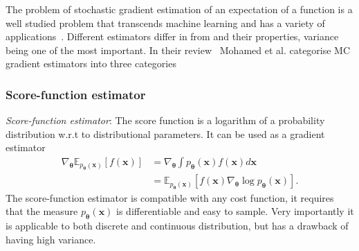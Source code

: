 The problem of stochastic gradient estimation of an expectation of a function is a well studied problem that transcends machine learning and has a variety of applications~\cite{chriss1997black, schrittwieser2020mastering}. Different estimators differ in from and their properties, variance being one of the most important. In their review~\cite{mohamed2020monte} Mohamed et al. categorise MC gradient estimators into three categories

\subsubsection{Score-function estimator}
\emph{Score-function estimator}: The score function is a logarithm of a probability distribution w.r.t to distributional parameters. It can be used as a gradient estimator
\begin{equation}
	\begin{aligned}
		\nabla_{\boldsymbol{\theta}} \mathbb{E}_{p_{\boldsymbol{\theta}}(\mathbf{x})}[f(\mathbf{x})] &=  \nabla_{\boldsymbol{\theta}} \int p_{\boldsymbol{\theta}}(\mathbf{x}) f(\mathbf{x}) d \mathbf{x} \\
		&= \mathbb{E}_{p_{\boldsymbol{\theta}}(\mathbf{x})}\left[f(\mathbf{x}) \nabla_{\boldsymbol{\theta}} \log p_{\boldsymbol{\theta}}(\mathbf{x})\right].
	\end{aligned}
\end{equation}
The score-function estimator is compatible with any cost function, it requires that the measure $p_{\boldsymbol{\theta}}(\mathbf{x})$ is differentiable and easy to sample. Very importantly it is applicable to both discrete and continuous distribution, but has a drawback of having high variance.
	

